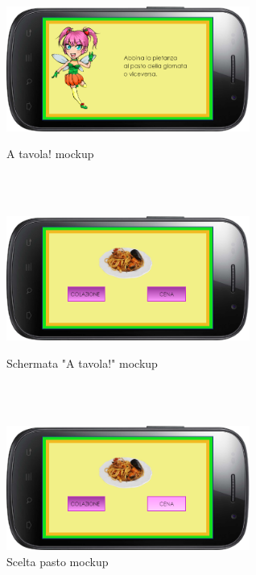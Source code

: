 \begin{figure}
 \begin{minipage}[c]{\columnwidth}
   \centering
   \includegraphics[width=8cm]{Images/Mockup/gioco3}
   \caption{A tavola! mockup}
   \label{fig:A tavola!}
 \end{minipage}
 \ \hspace{8mm} \hspace{8mm} \\\
 
 \begin{minipage}[c]{\columnwidth}
  \centering
   \includegraphics[width=8cm]{Images/Mockup/atavola}
   \caption{Schermata "A tavola!" mockup}
   \label{fig:Schermata "A tavola!"}
 \end{minipage}
 \ \hspace{8mm} \hspace{8mm} \\\
 
 \begin{minipage}[c]{\columnwidth}
  \centering
   \includegraphics[width=8cm]{Images/Mockup/atavolascelta}
   \caption{Scelta pasto mockup}
   \label{fig:Scelta "A tavola!"}
 \end{minipage}
\end{figure}
\clearpage


